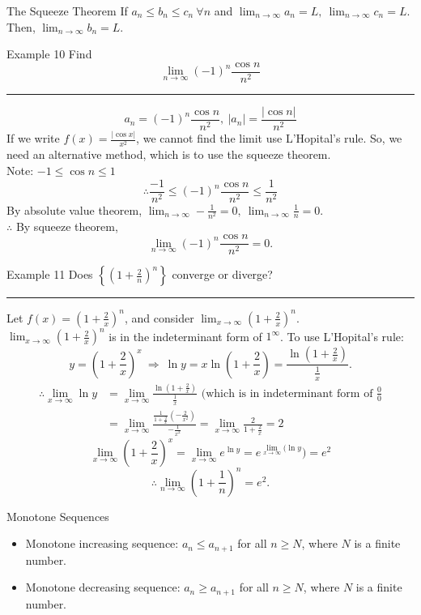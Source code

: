 \documentclass[12pt,a4paper]{article}
\begin{document}
\begin{thm}{The Squeeze Theorem}
	If $a_n\leq b_n\leq c_n\ \forall n$ and 	$\displaystyle\lim_{n\to\infty}a_n=L,\ \lim_{n\to\infty}c_n=L.$\\
	Then, $\displaystyle\lim_{n\to\infty}b_n=L.$
\end{thm}
\begin{eg}{Example 10}
	Find $$\lim_{n\to\infty}(-1)^n\frac{\cos n}{n^2}$$
	\noindent\rule[0.25\baselineskip]{\textwidth}{1pt}
	$$a_n=(-1)^n\frac{\cos n}{n^2},\ |a_n|=\frac{|\cos n|}{n^2}$$
	If we write $\displaystyle f(x)=\frac{|\cos x|}{x^2}$, we cannot find the limit use L'Hopital's rule. So, we need an alternative method, which is to use the squeeze theorem. \\
	Note: $-1\leq\cos{n}\leq 1$
	$$\therefore\frac{-1}{n^2}\leq(-1)^n\frac{\cos{n}}{n^2}\leq\frac{1}{n^2}$$
	By absolute value theorem, $\displaystyle\lim_{n\to\infty}-\frac{1}{n^2}=0,\ \lim_{n\to\infty}\frac{1}{n}=0$.\\
	$\therefore$ By squeeze theorem, 
	$$\lim_{n\to\infty}(-1)^n\frac{\cos n}{n^2}=0.$$
\end{eg}
\begin{eg}{Example 11}
	Does $\displaystyle\left\{\left(1+\frac{2}{n}\right)^n\right\}$ converge or diverge? \\
	\noindent\rule[0.25\baselineskip]{\textwidth}{1pt}
	Let $\displaystyle f(x)=\left(1+\frac{2}{x}\right)^n$, and consider $\displaystyle\lim_{x\to\infty}\left(1+\frac{2}{x}\right)^n.$\\
	$\displaystyle\lim_{x\to\infty}\left(1+\frac{2}{x}\right)^n$ is in the indeterminant form of $1^\infty$. To use L'Hopital's rule: 
	$$y=\left(1+\frac{2}{x}\right)^x\ \Rightarrow\ \ln{y}=x\ln{\left(1+\frac{2}{x}\right)}=\frac{\ln\left(1+\frac{2}{x}\right)}{\frac{1}{x}}.$$
	$$\begin{aligned}
		\therefore\lim_{x\to\infty}\ln{y}&=\lim_{x\to\infty}\frac{\ln\left(1+\frac{2}{x}\right)}{\frac{1}{x}}\text{ (which is in indeterminant form of }\frac{0}{0}\\
		&=\lim_{x\to\infty}\frac{\frac{1}{1+\frac{2}{x}}\left(-\frac{2}{x^2}\right)}{-\frac{1}{x^2}}=\lim_{x\to\infty}\frac{2}{1+\frac{2}{x}}=2
	\end{aligned}$$
	$$\lim_{x\to\infty}\left(1+\frac{2}{x}\right)^x=\lim_{x\to\infty}e^{\ln{y}}=e^{\lim_{x\to\infty}(\ln{y}})=e^2$$
	$$\therefore\lim_{n\to\infty}\left(1+\frac{1}{n}\right)^n=e^2.$$
\end{eg}
\begin{df}{Monotone Sequences}
	\begin{itemize}
		\item Monotone increasing sequence: $a_n\leq a_{n+1}$ for all $n\geq N$, where $N$ is a finite number. 
		\item Monotone decreasing sequence: $a_n\geq a_{n+1}$ for all $n\geq N$, where $N$ is a finite number. 
	\end{itemize}	
\end{df}
\end{document}
